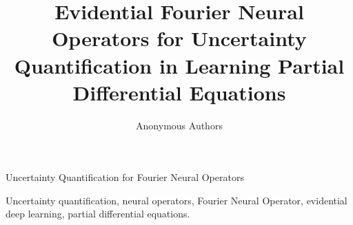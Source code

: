 \documentclass[journal]{IEEEtran}
\begin{document}
\title{Evidential Fourier Neural Operators for Uncertainty Quantification in Learning Partial Differential Equations}

\author{Anonymous Authors}

%
{Uncertainty Quantification for Fourier Neural Operators}

\maketitle



\begin{IEEEkeywords}
Uncertainty quantification, neural operators, Fourier Neural Operator, evidential deep learning, partial differential equations.
\end{IEEEkeywords}

\IEEEpeerreviewmaketitle






\clearpage
\onecolumn


\end{document}
